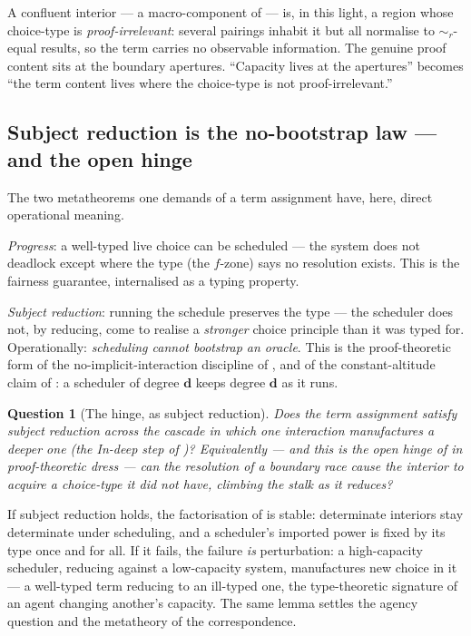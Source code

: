 \documentclass[11pt]{article}
\theoremstyle{definition}
\theoremstyle{plain}
\newtheorem{question}{Question}
\theoremstyle{remark}
\newcommand{\rbisim}{\sim_{r}}
\begin{document}
A confluent interior --- a macro-component of \cite{agency} --- is, in this light, a region whose choice-type
is \emph{proof-irrelevant}: several pairings inhabit it but all normalise to $\rbisim$-equal results, so the
term carries no observable information. The genuine proof content sits at the boundary apertures. ``Capacity
lives at the apertures'' \cite{agency} becomes ``the term content lives where the choice-type is not
proof-irrelevant.''

\subsection{Subject reduction is the no-bootstrap law --- and the open hinge}

The two metatheorems one demands of a term assignment have, here, direct operational meaning.

\emph{Progress}: a well-typed live choice can be scheduled --- the system does not deadlock except where the
type (the $f$-zone) says no resolution exists. This is the fairness guarantee, internalised as a typing property.

\emph{Subject reduction}: running the schedule preserves the type --- the scheduler does not, by reducing,
come to realise a \emph{stronger} choice principle than it was typed for. Operationally: \emph{scheduling
cannot bootstrap an oracle}. This is the proof-theoretic form of the no-implicit-interaction discipline of
\cite{paths}, and of the constant-altitude claim of \cite{agency}: a scheduler of degree $\mathbf d$ keeps
degree $\mathbf d$ as it runs.

\begin{question}[The hinge, as subject reduction]\label{q:sr}
Does the term assignment satisfy subject reduction across the cascade in which one interaction manufactures a
deeper one (the In-deep step of \cite{paths})? Equivalently --- and this is the open hinge of \cite{agency} in
proof-theoretic dress --- can the resolution of a boundary race cause the interior to acquire a choice-type it
did not have, climbing the stalk as it reduces?
\end{question}

\noindent
If subject reduction holds, the factorisation of \cite{agency} is stable: determinate interiors stay determinate
under scheduling, and a scheduler's imported power is fixed by its type once and for all. If it fails, the
failure \emph{is} perturbation: a high-capacity scheduler, reducing against a low-capacity system, manufactures
new choice in it --- a well-typed term reducing to an ill-typed one, the type-theoretic signature of an agent
changing another's capacity. The same lemma settles the agency question and the metatheory of the correspondence.
\end{document}
